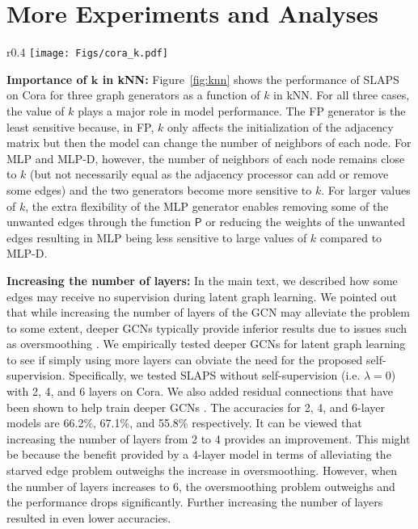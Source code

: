 \documentclass{article}
\newcommand{\func}[1]{\ensuremath{\mathsf{#1}}}
\begin{document}
\section{More Experiments and Analyses}
\begin{wrapfigure}{r}{0.4\columnwidth}
   \texttt{[image: Figs/cora\_k.pdf]}
   \caption{\label{fig:knn} The performance of SLAPS on Cora as a function of $k$ in kNN.}
\end{wrapfigure}
\textbf{Importance of $\bm{k}$ in kNN:} Figure~\ref{fig:knn} shows the performance of SLAPS on Cora for three graph generators as a function of $k$ in kNN. For all three cases, the value of $k$ plays a major role in model performance. The FP generator is the least sensitive because, in FP, $k$ only affects the initialization of the adjacency matrix but then the model can change the number of neighbors of each node.
For MLP and MLP-D, however, the number of neighbors of each node remains close to $k$ (but not necessarily equal as the adjacency processor can add or remove some edges) and the two generators become more sensitive to $k$. For larger values of $k$, the extra flexibility of the MLP generator enables removing some of the unwanted edges through the function $\func{P}$ or reducing the weights of the unwanted edges resulting in MLP being less sensitive to large values of $k$ compared to MLP-D.

\textbf{Increasing the number of layers:} In the main text, we described how some edges may receive no supervision during latent graph learning. We pointed out that while increasing the number of layers of the GCN may alleviate the problem to some extent, deeper GCNs typically provide inferior results due to issues such as oversmoothing \citep[see, e.g.,][]{li2018deeper,oono2020graph}. We empirically tested deeper GCNs for latent graph learning to see if simply using more layers can obviate the need for the proposed self-supervision. Specifically, we tested SLAPS without self-supervision (i.e. $\lambda=0$) with 2, 4, and 6 layers on Cora. We also added residual connections that have been shown to help train deeper GCNs \cite{li2019deepgcns}. The accuracies for 2, 4, and 6-layer models are 66.2\%, 67.1\%, and 55.8\% respectively. It can be viewed that increasing the number of layers from 2 to 4 provides an improvement. This might be because the benefit provided by a 4-layer model in terms of alleviating the starved edge problem outweighs the increase in oversmoothing. However, when the number of layers increases to 6, the oversmoothing problem outweighs and the performance drops significantly. Further increasing the number of layers resulted in even lower accuracies.
\end{document}
